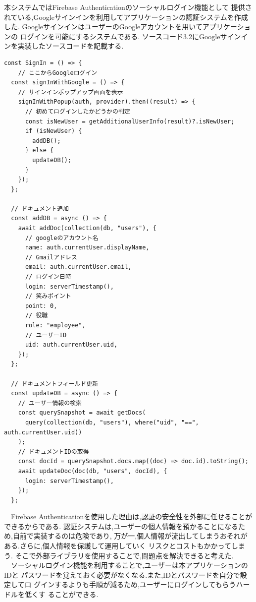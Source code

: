 本システムではFirebase Authenticationのソーシャルログイン機能として
提供されている,Googleサインインを利用してアプリケーションの認証システムを作成した. 
GoogleサインインはユーザーのGoogleアカウントを用いてアプリケーションの
ログインを可能にするシステムである. 
ソースコード3.2にGoogleサインインを実装したソースコードを記載する. \\

\begin{lstlisting}[caption=Googleログインの実装]
  const SignIn = () => {
    // ここからGoogleログイン
  const signInWithGoogle = () => {
    // サインインポップアップ画面を表示
    signInWithPopup(auth, provider).then((result) => {
      // 初めてログインしたかどうかの判定
      const isNewUser = getAdditionalUserInfo(result)?.isNewUser;
      if (isNewUser) {
        addDB();
      } else {
        updateDB();
      }
    });
  };

  // ドキュメント追加
  const addDB = async () => {
    await addDoc(collection(db, "users"), {
      // googleのアカウント名
      name: auth.currentUser.displayName,
      // Gmailアドレス
      email: auth.currentUser.email,
      // ログイン日時
      login: serverTimestamp(),
      // 笑みポイント
      point: 0,
      // 役職
      role: "employee",
      // ユーザーID
      uid: auth.currentUser.uid,
    });
  };

  // ドキュメントフィールド更新
  const updateDB = async () => {
    // ユーザー情報の検索
    const querySnapshot = await getDocs(
      query(collection(db, "users"), where("uid", "==", auth.currentUser.uid))
    );
    // ドキュメントIDの取得
    const docId = querySnapshot.docs.map((doc) => doc.id).toString();
    await updateDoc(doc(db, "users", docId), {
      login: serverTimestamp(),
    });
  };
\end{lstlisting}

\vspace{12mm}

　Firebase Authenticationを使用した理由は,認証の安全性を外部に任せることができるからである.
認証システムは,ユーザーの個人情報を預かることになるため,自前で実装するのは危険であり,
万が一,個人情報が流出してしまうおそれがある.さらに,個人情報を保護して運用していく
リスクとコストもかかってしまう.
そこで外部ライブラリを使用することで,問題点を解決できると考えた. \\
　ソーシャルログイン機能を利用することで,ユーザーは本アプリケーションのIDと
パスワードを覚えておく必要がなくなる.また,IDとパスワードを自分で設定してロ
グインするよりも手順が減るため,ユーザーにログインしてもらうハードルを低くす
ることができる. \\
　

